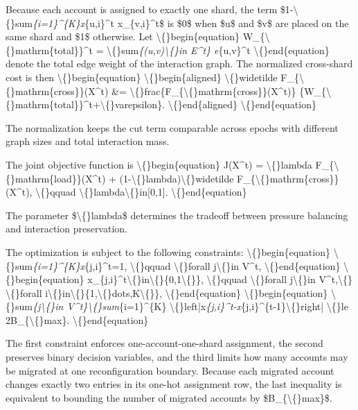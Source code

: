 \documentclass{article}
\begin{document}
Because each account is assigned to exactly one shard, the term \$1-\textbackslash\{\}sum\emph{\{i=1\}^\{K\}x}\{u,i\}^t x\_\{v,i\}^t\$ is \$0\$ when \$u\$ and \$v\$ are placed on the same shard and \$1\$ otherwise. Let
\textbackslash\{\}begin\{equation\}
W\_\{\textbackslash\{\}mathrm\{total\}\}^t
=
\textbackslash\{\}sum\emph{\{(u,v)\textbackslash\{\}in E^t\} e}\{u,v\}^t
\textbackslash\{\}end\{equation\}
denote the total edge weight of the interaction graph. The normalized cross-shard cost is then
\textbackslash\{\}begin\{equation\}
\textbackslash\{\}begin\{aligned\}
\textbackslash\{\}widetilde F\_\{\textbackslash\{\}mathrm\{cross\}\}(X^t)
\&=
\textbackslash\{\}frac\{F\_\{\textbackslash\{\}mathrm\{cross\}\}(X^t)\}
\{W\_\{\textbackslash\{\}mathrm\{total\}\}^t+\textbackslash\{\}varepsilon\}.
\textbackslash\{\}end\{aligned\}
\textbackslash\{\}end\{equation\}

The normalization keeps the cut term comparable across epochs with different graph sizes and total interaction mass.

The joint objective function is
\textbackslash\{\}begin\{equation\}
J(X^t)
=
\textbackslash\{\}lambda F\_\{\textbackslash\{\}mathrm\{load\}\}(X^t)
+
(1-\textbackslash\{\}lambda)\textbackslash\{\}widetilde F\_\{\textbackslash\{\}mathrm\{cross\}\}(X^t),
\textbackslash\{\}qquad
\textbackslash\{\}lambda\textbackslash\{\}in[0,1].
\textbackslash\{\}end\{equation\}

The parameter \$\textbackslash\{\}lambda\$ determines the tradeoff between pressure balancing and interaction preservation.

The optimization is subject to the following constraints:
\textbackslash\{\}begin\{equation\}
\textbackslash\{\}sum\emph{\{i=1\}^\{K\}x}\{j,i\}^t=1,
\textbackslash\{\}qquad
\textbackslash\{\}forall j\textbackslash\{\}in V^t,
\textbackslash\{\}end\{equation\}
\textbackslash\{\}begin\{equation\}
x\_\{j,i\}^t\textbackslash\{\}in\textbackslash\{\}\{0,1\textbackslash\{\}\},
\textbackslash\{\}qquad
\textbackslash\{\}forall j\textbackslash\{\}in V^t,\textbackslash\{\} \textbackslash\{\}forall i\textbackslash\{\}in\textbackslash\{\}\{1,\textbackslash\{\}dots,K\textbackslash\{\}\},
\textbackslash\{\}end\{equation\}
\textbackslash\{\}begin\{equation\}
\textbackslash\{\}sum\emph{\{j\textbackslash\{\}in V^t\}\textbackslash\{\}sum}\{i=1\}^\{K\}
\textbackslash\{\}left|x\emph{\{j,i\}^t-x}\{j,i\}^\{t-1\}\textbackslash\{\}right|
\textbackslash\{\}le 2B\_\{\textbackslash\{\}max\}.
\textbackslash\{\}end\{equation\}

The first constraint enforces one-account-one-shard assignment, the second preserves binary decision variables, and the third limits how many accounts may be migrated at one reconfiguration boundary. Because each migrated account changes exactly two entries in its one-hot assignment row, the last inequality is equivalent to bounding the number of migrated accounts by \$B\_\{\textbackslash\{\}max\}\$.
\end{document}
